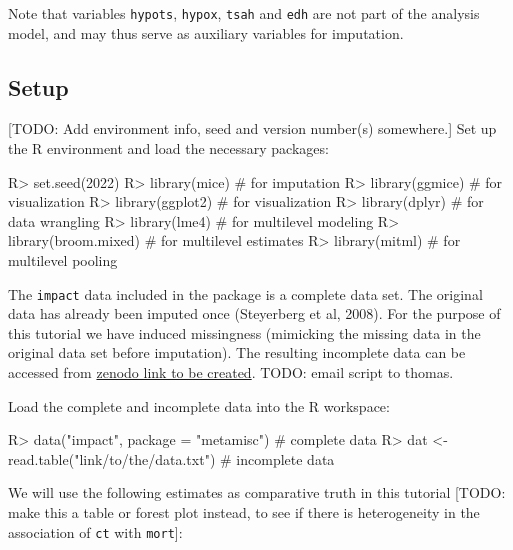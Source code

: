 \documentclass[
]{jss}
\begin{document}
Note that variables \texttt{hypots}, \texttt{hypox}, \texttt{tsah} and
\texttt{edh} are not part of the analysis model, and may thus serve as
auxiliary variables for imputation.

\hypertarget{setup}{%
\subsection{Setup}\label{setup}}

{[}TODO: Add environment info, seed and version number(s) somewhere.{]}
Set up the R environment and load the necessary packages:

\begin{CodeChunk}
\begin{CodeInput}
R> set.seed(2022)
R> library(mice)         # for imputation
R> library(ggmice)       # for visualization
R> library(ggplot2)      # for visualization
R> library(dplyr)        # for data wrangling
R> library(lme4)         # for multilevel modeling
R> library(broom.mixed)  # for multilevel estimates
R> library(mitml)        # for multilevel pooling
\end{CodeInput}
\end{CodeChunk}

The \texttt{impact} data included in the  package is a
complete data set. The original data has already been imputed once
(Steyerberg et al, 2008). For the purpose of this tutorial we have
induced missingness (mimicking the missing data in the original data set
before imputation). The resulting incomplete data can be accessed from
\href{https://zenodo.com}{zenodo link to be created}. TODO: email script
to thomas.

Load the complete and incomplete data into the R workspace:

\begin{CodeChunk}
\begin{CodeInput}
R> data("impact", package = "metamisc")      # complete data
R> dat <- read.table("link/to/the/data.txt") # incomplete data
\end{CodeInput}
\end{CodeChunk}

We will use the following estimates as comparative truth in this
tutorial {[}TODO: make this a table or forest plot instead, to see if
there is heterogeneity in the association of \texttt{ct} with
\texttt{mort}{]}:
\end{document}
